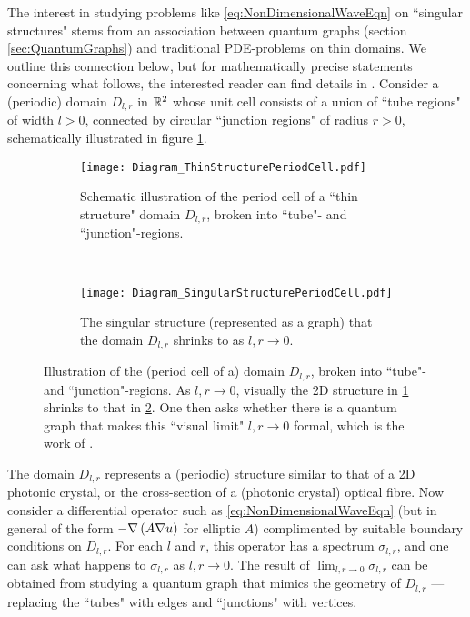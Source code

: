 The interest in studying problems like \eqref{eq:NonDimensionalWaveEqn} on ``singular structures" stems from an association between quantum graphs (section \ref{sec:QuantumGraphs}) and traditional PDE-problems on thin domains.
We outline this connection below, but for mathematically precise statements concerning what follows, the interested reader can find details in \cite{exner2005convergence, kuchment2001convergence}.
Consider a (periodic) domain $D_{l,r}$ in $\mathbb{R}^2$ whose unit cell consists of a union of ``tube regions" of width $l>0$, connected by circular ``junction regions" of radius $r>0$, schematically illustrated in figure \ref{fig:Diagram_ThinStructurePeriodCell}.
\begin{figure}[b!]
	\begin{subfigure}[t]{0.45\textwidth}
		\centering
		\texttt{[image: Diagram\_ThinStructurePeriodCell.pdf]}
		\caption{\label{fig:Diagram_ThinStructurePeriodCell} Schematic illustration of the period cell of a ``thin structure" domain $D_{l,r}$, broken into ``tube"- and ``junction"-regions.}
	\end{subfigure}
	~
	\begin{subfigure}[t]{0.45\textwidth}
		\centering
		\texttt{[image: Diagram\_SingularStructurePeriodCell.pdf]}
		\caption{\label{fig:Diagram_SingularStructurePeriodCell} The singular structure (represented as a graph) that the domain $D_{l,r}$ shrinks to as $l,r\rightarrow0$.}
	\end{subfigure}
	\caption{\label{fig:Diagram_ThinToSingular} Illustration of the (period cell of a) domain $D_{l,r}$, broken into ``tube"- and ``junction"-regions. As $l,r\rightarrow0$, visually the 2D structure in \ref{fig:Diagram_ThinStructurePeriodCell} shrinks to that in \ref{fig:Diagram_SingularStructurePeriodCell}. One then asks whether there is a quantum graph that makes this ``visual limit" $l,r\rightarrow0$ formal, which is the work of \cite{exner2005convergence, kuchment2001convergence}.}
\end{figure}
The domain $D_{l,r}$ represents a (periodic) structure similar to that of a 2D photonic crystal, or the cross-section of a (photonic crystal) optical fibre.
Now consider a differential operator such as \eqref{eq:NonDimensionalWaveEqn} (but in general of the form $-\nabla\left( A\nabla u \right)$ for elliptic $A$) complimented by suitable boundary conditions on $D_{l,r}$.
For each $l$ and $r$, this operator has a spectrum $\sigma_{l,r}$, and one can ask what happens to $\sigma_{l,r}$ as $l,r\rightarrow0$.
The result of $\lim_{l,r\rightarrow0}\sigma_{l,r}$ can be obtained from studying a quantum graph that mimics the geometry of $D_{l,r}$ --- replacing the ``tubes" with edges and ``junctions" with vertices.
